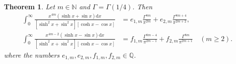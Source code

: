 \documentclass[11pt]{article}
\theoremstyle{plain}
\newtheorem{thm}{Theorem}[section]
\theoremstyle{definition}
\begin{document}
\begin{thm}\label{mixInt2}
Let $m\in \mathbb{N} $ and $\Gamma=\Gamma(1/4)$. Then
\begin{align}\label{IntbarS2p}
\int_0^{\infty}{\frac{x^{4m}\left( \sinh x+\sin x \right) \mathrm{d}x}{\left[ \sinh ^2x+\sin ^2x \right] \left[ \cosh x-\cos x \right]}}&= e_{1,m} \frac{\Gamma ^{8m}}{\pi ^{2m}}+e_{2,m} \frac{\Gamma ^{8m+4}}{\pi ^{2m+2}},
\\
\int_0^{\infty}{\frac{x^{4m-2}\left( \sinh x-\sin x \right) \mathrm{d}x}{\left[ \sinh ^2x+\sin ^2x \right] \left[ \cosh x-\cos x \right]}}&= f_{1,m} \frac{\Gamma ^{8m-4}}{\pi ^{2m-1}}+f_{2,m} \frac{\Gamma ^{8m}}{\pi ^{2m+1}}\quad (m\ge 2).
\end{align}
where the numbers $e_{1,m}, e_{2,m} ,f_{1,m}, f_{2,m} \in \mathbb{Q}$.
\end{thm}
\end{document}
